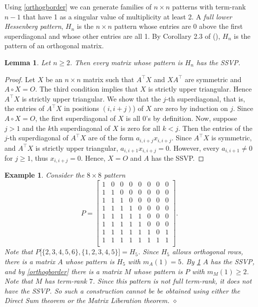 \documentclass[preprint,12pt]{elsarticle}
\newcommand{\trans  }{^\top}
\newtheorem{lemma}[theorem]{Lemma}
\newtheorem{Example}[theorem]{Example}
\begin{document}
Using \cref{orthogborder} we can generate families  of $n \times n$ patterns with term-rank $n-1$ that have 1 as a singular value of multiplicity at least 2. 
A \textit{full lower Hessenberg pattern},
$H_n$ is the $n\times n$ pattern whose entries are 0 above the first superdiagonal and whose other entries are all 1.  By Corollary 2.3 of (\cite{Cheon1999}), $H_n$ is the pattern 
of an orthogonal matrix. 



\begin{lemma}
\label{hessvp}
    Let $n \geq 2$. Then every matrix whose pattern is $H_n$ has the SSVP.
\end{lemma}
\begin{proof}
    Let $X$ be an $n \times n$ matrix such that $A\trans X$ and $X A\trans$ are symmetric and $A \circ X = O$. The third condition implies that $X$ is strictly upper triangular. Hence $A\trans X$ is strictly upper triangular. We show that the $j$-th superdiagonal, that is, the entries of $A\trans X$ in positions $(i,i+j)$) of $X$ are zero by induction on $j$. Since $A \circ X = O$, the first superdiagonal of $X$ is all 0's by definition. Now, suppose $j > 1$ and the  $k$th superdiagonal of $X$ is zero for all $k < j$. Then the entries of the $j$-th superdiagonal of $A\trans X$ are of the form $a_{i,i+j}x_{i,i+j}$. Since $A\trans X$ is symmetric, and $A\trans X$ is strictly upper triangular, $a_{i,i+1}x_{i,i+j} = 0$. However, every $a_{i,i+1} \neq 0$ for $j \geq 1$, thus $x_{i,i+j} = 0$. Hence, $X =O$ and $A$ has the SSVP. 
    \end{proof}

\begin{Example}
\rm 
    Consider the $8\times 8$ pattern
    \[ P = 
    \left[ 
    \begin{array}{cccccccc}
        1 & 0 & 0 & 0 & 0 & 0 & 0 & 0  \\
        1 & 1 & 0 & 0 & 0 & 0 & 0 & 0  \\
        1 & 1 & 1 & 0 & 0 & 0 & 0 & 0 \\
        1 & 1 & 1 & 1 & 0 & 0 & 0 & 0 \\
        1 & 1 & 1 & 1 & 1 & 0 & 0 & 0 \\
        1 & 1 & 1 & 1 & 1 & 0 & 0 & 0 \\
        1 & 1 & 1 & 1 & 1 & 1 & 0 & 1\\
        1 & 1 & 1 & 1 & 1 & 1 & 1 & 1\\
    \end{array}
    \right].
    \]
  Note that $P\lbrack \{2,3,4,5,6\},\{1,2,3,4,5\}\rbrack = H_5$. Since $H_5$ allows orthogonal rows, there is a matrix $A$ whose pattern is $H_5$ with $m_A(1) = 5$.  
  By \cref{hessvp} $A$ has the SSVP, and by \cref{orthogborder} there is a matrix $M$ whose pattern is $P$ with $m_M(1)  \geq 2$. Note that $M$ has term-rank  $7$. Since this pattern is not full term-rank, it does not have the SSVP. So such a construction cannot be be obtained using either the Direct Sum theorem or the Matrix Liberation theorem.
\hfill $\diamond$  \end{Example}
\end{document}
